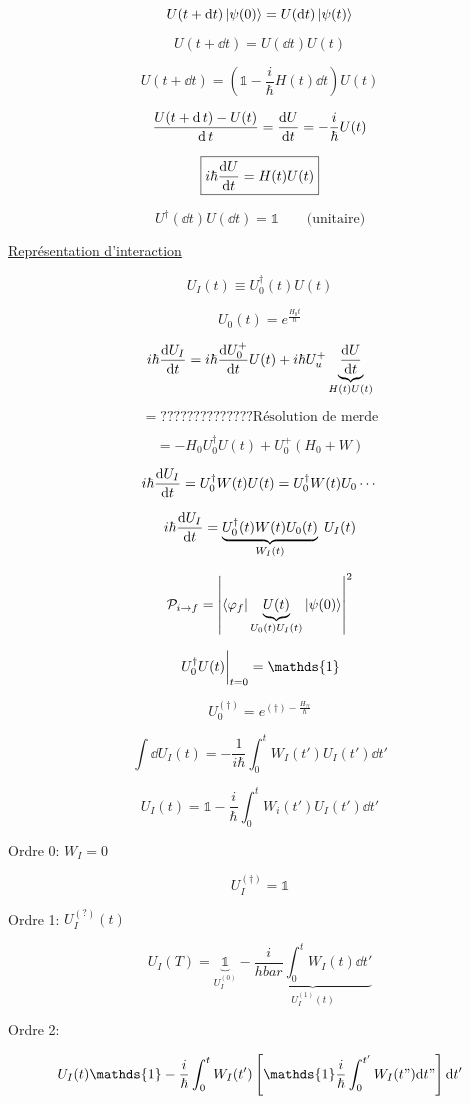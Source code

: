 $$U(t + \dd t) \ket{\psi(0)} = U(\dd t) \ket{\psi (t)}$$ 

$$U(t +\dd t) = U(\dd t) U(t)$$ 


$$U(t + \dd t) = \left( \mathds{1} - \frac{i}{\hbar} H(t) \dd t \right) U(t)$$ 

$$\frac{U(t+\dd{}t)-U(t)}{\dd{}t} = \dv{U}{t} = - \frac{i}{\hbar} U(t)$$ 

$$\boxed{i\hbar \dv{U}{t} = H(t)U(t)}$$ 


$$U^\dagger(\dd t) U(\dd t) = \mathds{1} \qquad \text{(unitaire)}$$ 


\underline{Représentation d'interaction} 


$$U_I(t) \equiv U_{0}^\dagger (t) U(t)$$ 

$$U_0(t) = e^{\frac{H_{0}t}{\hbar} }$$ 


$$i \hbar \dv{U_I}{t} = i\hbar \dv{U_{0}^+}{t} U(t) + i\hbar U_{u}^+ \underbrace{\dv{U}{t}}_{H(t)U(t)} $$ 


$$= ?????????????? \text{Résolution de merde}$$ 

$$= -H_{0} U_{0}^\dagger U(t) + U_{0}^+ (H_{0} +W)$$ 

$$i\hbar \dv{U_I}{t} = U_{0}^\dagger W(t) U(t) = U_{0}^\dagger W(t) U_{0} \dotsb$$ 

$$i\hbar \dv{U_I}{t} = \underbrace{U_{0}^\dagger(t) W(t) U_0(t)}_{W_{I} (t)} \; U_{I} (t)$$ 


$$\mathcal{P}_{i \to f} = \abs{\bra{\varphi_f}\underbrace{U(t)}_{U_0(t) U_I(t)} \ket{\psi(0)}}^2$$ 





$$\eval{U_{0}^\dagger U(t)}_{t=0} = \mathds{1}$$ 


$$U_{0}^{(\dagger)} = e^{(\dagger)- \frac{H_{?t}}{\hbar} }$$ 


$$\int \dd U_{I} (t) = -\frac{1}{i\hbar}  \int_{0}^t W_{I} (t') U_{I} (t') \dd t'$$ 


$$U_{I} (t) = \mathds{1} - \frac{i}{\hbar} \int_{0}^t W_{i} (t') U_I(t') \dd t'$$ 


Ordre 0: $W_{I} =0$ 

$$U_{I}^(\dagger) = \mathds{1}$$ 

Ordre 1: $U_{I}^(?)(t) $ 

$$U_{I} (T) = \underbrace{\mathds{1}}_{U_{I}^{(0)}}  - \underbrace{\frac{i}{hbar} \int_{0}^t W_{I} (t) \dd t'}_{U_{I}^(1) (t)} $$ 

Ordre 2:

$$ U_{I} (t) \mathds{1} - \frac{i}{\hbar} \int_{0}^t W_{I} (t') \left[ \mathds{1} \frac{i}{\hbar} \int_{0}^{t'} W_{I} (t") \dd t" \right] \dd t'$$ 

